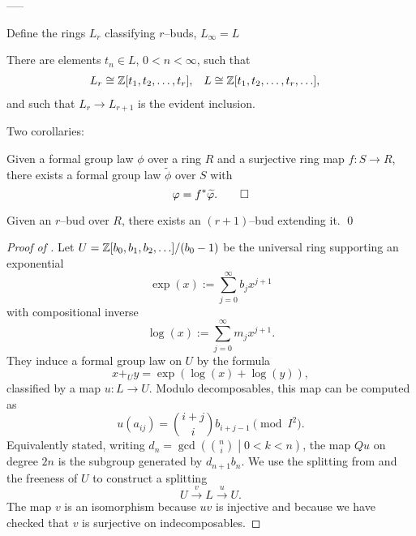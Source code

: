 -----



Define the rings $L_r$ classifying $r$--buds, $L_\infty = L$

\begin{theorem}\label{LazardsTheorem}
There are elements $t_n \in L$, $0 < n < \infty$, such that
\begin{align*}
L_r & \cong \Z[t_1, t_2, \ldots, t_r], &
L & \cong \Z[t_1, t_2, \ldots, t_r, \ldots],
\end{align*}
and such that $L_r \to L_{r+1}$ is the evident inclusion.
\end{theorem}

Two corollaries:

\begin{corollary}
Given a formal group law $\phi$ over a ring $R$ and a surjective ring map $f: S \to R$, there exists a formal group law $\widetilde \phi$ over $S$ with \[\phi = f^* \widetilde \phi. \qed\]
\end{corollary}

\begin{corollary}
Given an $r$--bud over $R$, there exists an $(r+1)$--bud extending it. \qed
\end{corollary}

\begin{proof}[{Proof of }]
Let $U = \Z[b_0, b_1, b_2, \ldots] / (b_0 - 1)$ be the universal ring supporting an exponential \[\exp(x) := \sum_{j=0}^\infty b_j x^{j+1}\] with compositional inverse \[\log(x) := \sum_{j=0}^\infty m_j x^{j+1}.\]  They induce a formal group law on $U$ by the formula \[x +_U y = \exp(\log(x) + \log(y)),\] classified by a map $u: L \to U$.  Modulo decomposables, this map can be computed as \[u(a_{ij}) = \binom{i+j}{i} b_{i+j-1} \pmod{I^2}.\]  Equivalently stated, writing $d_n = \gcd\left( \binom{n}{i} \middle| 0 < k < n \right)$, the map $Qu$ on degree $2n$ is the subgroup generated by $d_{n+1} b_n$.  We use the splitting from  and the freeness of $U$ to construct a splitting \[U \xrightarrow{v} L \xrightarrow{u} U.\]  The map $v$ is an isomorphism because $uv$ is injective and because we have checked that $v$ is surjective on indecomposables.
\end{proof}


